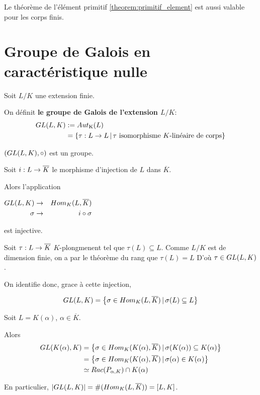 \begin{remarque}
	Le théorème de l'élément primitif \ref{theorem:primitif_element} est aussi
	valable pour les corps finis.
\end{remarque}

\section{Groupe de Galois en caractéristique nulle}

\begin{definition} 
	Soit $L/K$ une extension finie.

	On définit \textbf{le groupe de Galois de l'extension $L/K$}:
	\begin{align*}
		GL(L, K) & := Aut_{\text{K}}(L) \\
		& = \left\{\tau : L \rightarrow L \, | \, \text{$\tau$ isomorphisme
		$K$-linéaire de corps} \right\}
	\end{align*}

	$(GL(L, K), \circ)$ est un groupe.
\end{definition}

Soit $i : L \rightarrow \overline{K}$ le morphisme d'injection de $L$ dans
$\overline{K}$.

Alors l'application

\begin{center}
$
\begin{aligned}
	GL(L, K) &\rightarrow& Hom_{K}(L, \overline{K}) \\
	\sigma &\rightarrow& i \circ \sigma
\end{aligned}
$
\end{center}

est injective.

Soit $\tau : L \rightarrow \overline{K}$ $K$-plongmenent tel que $\tau(L)
\subseteq L$. Comme $L/K$ est de dimension finie, on a par le théorème du rang
que $\tau(L) = L$
D'où $\tau \in GL(L, K)$.

On identifie donc, grace à cette injection,

\begin{equation*}
	GL(L, K) = \left\{\sigma \in
	Hom_{K}(L, \overline{K}) \, | \, \sigma(L) \subseteq L \right\}
\end{equation*}

\begin{exemple}
	Soit $L = K(\alpha)$, $\alpha \in \overline{K}$.

	Alors
	\begin{align*}
		GL(K(\alpha), K)
		& = \left\{\sigma \in
			Hom_{K}(K(\alpha), \overline{K}) \, | \, \sigma(K(\alpha)) \subseteq
			K(\alpha) \right\} \\
		& = \left\{\sigma \in
			Hom_{K}(K(\alpha), \overline{K}) \, | \, \sigma(\alpha) \in
			K(\alpha) \right\} \\
		& \simeq Rac(P_{\alpha, K}) \cap K(\alpha)
	\end{align*}

	En particulier, $|GL(L, K)| =
	\#(Hom_{K}(L, \overline{K})) = [L, K]$.
\end{exemple}

